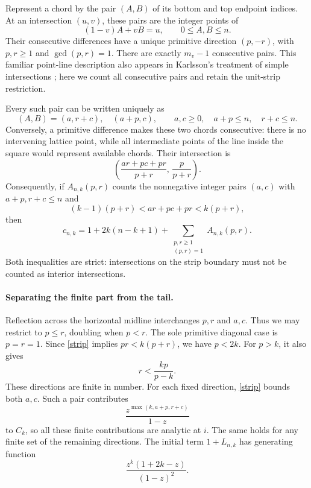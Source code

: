 \documentclass[11pt]{article}
\begin{document}
Represent a chord by the pair \((A,B)\) of its bottom and top endpoint
indices. At an intersection \((u,v)\), these pairs are the integer
points of
\[
 (1-v)A+vB=u,\qquad 0\le A,B\le n .
\]
Their consecutive differences have a unique primitive direction
\((p,-r)\), with \(p,r\ge1\) and \(\gcd(p,r)=1\).
There are exactly \(m_v-1\) consecutive pairs. This familiar
point-line description also appears in Karlsson's treatment of
simple intersections \cite{Karlsson}; here we count all consecutive
pairs and retain the unit-strip restriction.

Every such pair can be written uniquely as
\[
 (A,B)=(a,r+c),\quad(a+p,c),
 \qquad a,c\ge0,\quad a+p\le n,\quad r+c\le n.
\]
Conversely, a primitive difference makes these two chords consecutive:
there is no intervening lattice point, while all intermediate points
of the line inside the square would represent available chords.
Their intersection is
\[
 \left(\frac{ar+pc+pr}{p+r},\,\frac{p}{p+r}\right).
\]
Consequently, if \(A_{n,k}(p,r)\) counts the nonnegative integer pairs
\((a,c)\) with \(a+p,r+c\le n\) and
\begin{equation}\label{strip}
 (k-1)(p+r)<ar+pc+pr<k(p+r),
\end{equation}
then
\begin{equation}\label{primitive}
 c_{n,k}=1+2k(n-k+1)+
 \sum_{\substack{p,r\ge1\\(p,r)=1}} A_{n,k}(p,r).
\end{equation}
Both inequalities are strict: intersections on the strip boundary
must not be counted as interior intersections.

\paragraph{Separating the finite part from the tail.}
Reflection across the horizontal midline interchanges \(p,r\) and
\(a,c\). Thus we may restrict to \(p\le r\), doubling when \(p<r\).
The sole primitive diagonal case is \(p=r=1\).
Since \eqref{strip} implies \(pr<k(p+r)\), we have \(p<2k\).
For \(p>k\), it also gives
\[
 r<\frac{kp}{p-k}.
\]
These directions are finite in number. For each fixed direction,
\eqref{strip} bounds both \(a,c\). Such a pair contributes
\[
 \frac{z^{\max(k,a+p,r+c)}}{1-z}
\]
to \(C_k\), so all these finite contributions are analytic at \(i\).
The same holds for any finite set of the remaining directions.
The initial term \(1+L_{n,k}\) has generating function
\begin{equation}\label{base}
 \frac{z^k(1+2k-z)}{(1-z)^2}.
\end{equation}
\end{document}

